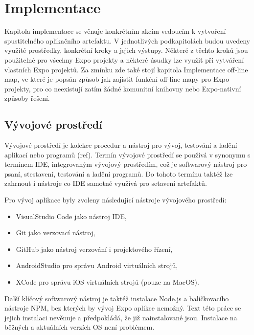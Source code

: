 
\chapter{Implementace}

Kapitola implementace se věnuje konkrétním akcím vedoucím k vytvoření spustitelného aplikačního artefaktu. V jednotlivých podkapitolách budou uvedeny využité prostředky, konkrétní kroky a jejich výstupy. Některé z těchto kroků jsou použitelné pro všechny Expo projekty a některé úsudky lze využit při vytváření vlastních Expo projektů. Za zmínku zde také stojí kapitola Implementace off-line map, ve které je popsán způsob jak zajistit funkční off-line mapy pro Expo projekty, pro co neexistují zatím žádné komunitní knihovny nebo Expo-nativní způsoby řešení.

\section{Vývojové prostředí}


Vývojové prostředí je kolekce procedur a nástroj pro vývoj, testování a ladění aplikací nebo programů (ref). Termín vývojové prostředí se používá v synonymu s termínem IDE, integrovaným vývojový prostředím, což je softwarový nástroj pro psaní, stestavení, testování a ladění programů. Do tohoto termínu taktéž lze zahrnout i nástroje co IDE samotné využívá pro setavení artefaktů.

Pro vývoj aplikace byly zvoleny následující nástroje vývojového prostředí:

\begin{itemize}
	\item VisualStudio Code jako nástroj IDE,
	\item Git jako verzovací nástroj,
	\item GitHub jako nástroj verzování i projektového řízení,
	\item AndroidStudio pro správu Android virtuálních strojů,
	\item XCode pro správu iOS virtuálních strojů (pouze na MacOS).
\end{itemize}

Další klíčový softwarový nástroj je taktéž instalace Node.js a balíčkovacího nástroje NPM, bez kterých by vývoj Expo aplikce nemožný. Text této práce se jejich instalaci nevěnuje a předpokládá, že již nainstalované jsou. Instalace na běžných a aktuálních verzích OS není problémem.

